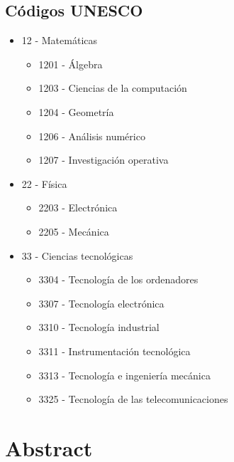\section*{Códigos UNESCO} 
\begin{itemize}
    \item[] 12 - Matemáticas
        \begin{itemize}
            \item[] 1201 - Álgebra
            \item[] 1203 - Ciencias de la computación 
            \item[] 1204 - Geometría 
            \item[] 1206 - Análisis numérico
            \item[] 1207 - Investigación operativa
        \end{itemize}
        
    \item[] 22 - Física
        \begin{itemize}
            \item[] 2203 - Electrónica
            \item[] 2205 - Mecánica 
        \end{itemize}
        
    \item[] 33 - Ciencias tecnológicas
        \begin{itemize}
            \item[] 3304 - Tecnología de los ordenadores
            \item[] 3307 - Tecnología electrónica
            \item[] 3310 - Tecnología industrial
            \item[] 3311 - Instrumentación tecnológica
            \item[] 3313 - Tecnología e ingeniería mecánica
            \item[] 3325 - Tecnología de las telecomunicaciones
        \end{itemize}
\end{itemize}

\newpage
{}
\chapter*{Abstract}  %

